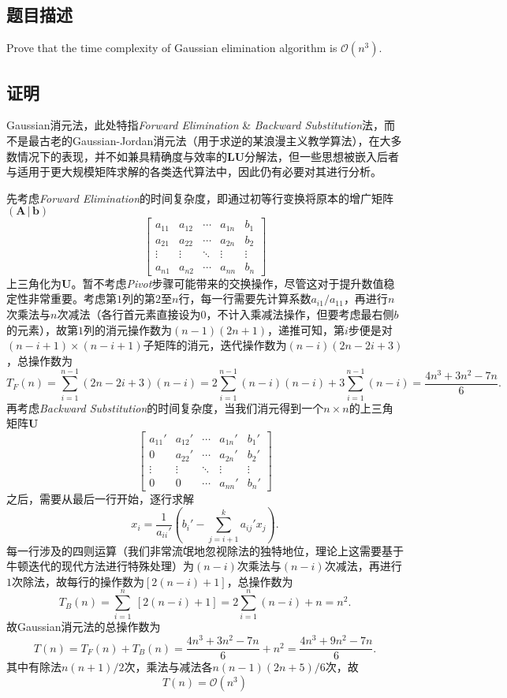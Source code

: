 \subsection{题目描述}
Prove that the time complexity of Gaussian elimination algorithm is $\mathcal{O}(n^3)$.
\subsection{证明}
Gaussian消元法，此处特指\textit{Forward Elimination} \& \textit{Backward Substitution}法，而不是最古老的Gaussian-Jordan消元法（用于求逆的某浪漫主义教学算法），在大多数情况下的表现，并不如兼具精确度与效率的$\bm{LU}$分解法，但一些思想被嵌入后者与适用于更大规模矩阵求解的各类迭代算法中，因此仍有必要对其进行分析。

先考虑\textit{Forward Elimination}的时间复杂度，即通过初等行变换将原本的增广矩阵
$\bm{(A \, | \, b)}$
\[
	\left[\begin{array}{cccc|c}a_{11}&a_{12}&\cdots&a_{1n}&b_{1}\\a_{21}&a_{22}&\cdots&a_{2n}&b_{2}\\\vdots&\vdots&\ddots&\vdots&\vdots\\a_{n 1}&a_{n 2}&\cdots&a_{n n}&b_{n}\end{array}\right]
\]
上三角化为$\bm{U}$。暂不考虑\textit{Pivot}步骤可能带来的交换操作，尽管这对于提升数值稳定性非常重要。考虑第$1$列的第$2$至$n$行，每一行需要先计算系数$a_{i1}/a_{11}$，再进行$n$次乘法与$n$次减法（各行首元素直接设为$0$，不计入乘减法操作，但要考虑最右侧$b$的元素），故第$1$列的消元操作数为$(n-1)(2n+1)$，递推可知，第$i$步便是对$(n-i+1)\times(n-i+1)$子矩阵的消元，迭代操作数为$(n-i)(2n-2i+3)$，总操作数为
\[
	T_F(n) =
	\sum_{i=1}^{n-1} (2n-2i+3)(n-i) = 2\sum_{i=1}^{n-1} (n-i)(n-i)+3\sum_{i=1}^{n-1} (n-i) = \frac{4n^3+3n^2-7n}{6}.
\]
再考虑\textit{Backward Substitution}的时间复杂度，当我们消元得到一个$n \times n$的上三角矩阵$\bm{U}$
\[
	\left[\begin{array}{cccc|c}a_{11}'&a_{12}'&\cdots&a_{1 n}'&b_{1}'\\0&a_{22}'&\cdots&a_{2 n}'&b_{2}'\\\vdots&\vdots&\ddots&\vdots&\vdots\\0&0&\cdots&a_{n n}'&b_{n}'\end{array}\right]
\]
之后，需要从最后一行开始，逐行求解
\[
	x_i=\frac{1}{a_{i i}'}\left(b_i'-\sum_{j=i+1}^ka_{i j}' x_j\right).
\]
每一行涉及的四则运算（我们非常流氓地忽视除法的独特地位，理论上这需要基于牛顿迭代的现代方法进行特殊处理）为$(n-i)$次乘法与$(n-i)$次减法，再进行$1$次除法，故每行的操作数为$[2(n-i)+1]$，总操作数为
\[
	T_B(n)=\sum_{i=1}^n \ [2(n-i)+1]=2\sum_{i=1}^n (n-i)+n=n^2.
\]
故Gaussian消元法的总操作数为
\[
	T(n)=T_F(n)+T_B(n)=\frac{4n^3+3n^2-7n}{6}+n^2=\frac{4n^3+9n^2-7n}{6}.
\]
其中有除法$n(n+1)/2$次，乘法与减法各$n(n-1)(2n+5)/6$次，故
\[
	\boxed{T(n) = \mathcal{O}(n^3)}
\]


